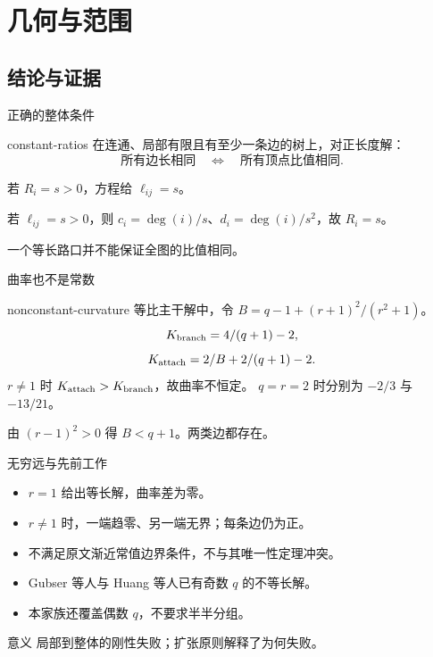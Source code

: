 \documentclass{beamer}
\begin{document}
\section{几何与范围}
\subsection{结论与证据}
\begin{frame}{正确的整体条件}
\begin{bookresult}{constant-ratios}
在连通、局部有限且有至少一条边的树上，对正长度解：
\[
\text{所有边长相同}\quad\Longleftrightarrow\quad
\text{所有顶点比值相同}.
\]
\end{bookresult}
若 $R_i=s>0$，方程给 $\ell_{ij}=s$。

若 $\ell_{ij}=s>0$，则 $c_i=\deg(i)/s$、$d_i=\deg(i)/s^2$，故 $R_i=s$。

一个等长路口并不能保证全图的比值相同。
\end{frame}
\begin{frame}{曲率也不是常数}
\small
\begin{bookresult}{nonconstant-curvature}
等比主干解中，令 $B=q-1+(r+1)^2/(r^2+1)$。
\[
K_{\rm branch}=4/(q+1)-2,
\]
\[
K_{\rm attach}=2/B+2/(q+1)-2.
\]
$r\ne1$ 时 $K_{\rm attach}>K_{\rm branch}$，故曲率不恒定。
$q=r=2$ 时分别为 $-2/3$ 与 $-13/21$。
\end{bookresult}
由 $(r-1)^2>0$ 得 $B<q+1$。两类边都存在。
\end{frame}
\begin{frame}{无穷远与先前工作}
\begin{itemize}
\item $r=1$ 给出等长解，曲率差为零。
\item $r\ne1$ 时，一端趋零、另一端无界；每条边仍为正。
\item 不满足原文渐近常值边界条件，不与其唯一性定理冲突。
\item Gubser 等人与 Huang 等人已有奇数 $q$ 的不等长解。
\item 本家族还覆盖偶数 $q$，不要求半半分组。
\end{itemize}
\begin{block}{意义}
局部到整体的刚性失败；扩张原则解释了为何失败。
\end{block}
\end{frame}
\end{document}
